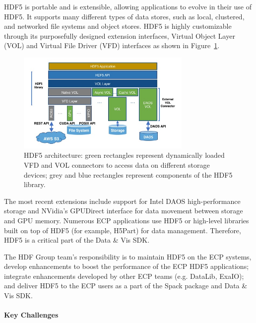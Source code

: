 HDF5 is portable and is extensible, allowing applications to evolve in their use of HDF5. It supports many different types of data stores, such as local, clustered, and networked file systems and object stores. HDF5 is highly customizable through its purposefully designed extension interfaces, Virtual Object Layer (VOL) and Virtual File Driver (VFD) interfaces as shown in Figure~\ref{fig:HDF5-Arch}.
\begin{figure}[htb]
    \centering
    \includegraphics[width=0.75\textwidth]{projects/2.3.4-DataViz/2.3.4.01-DataViz-SDK/HDF5-Arch-small.png}
    \caption{\label{fig:HDF5-Arch}
    HDF5 architecture: green rectangles represent dynamically loaded VFD and VOL connectors to access data on different storage devices; grey and blue rectangles represent components of the HDF5 library.}
\end{figure}

 The most recent extensions include support for Intel DAOS high-performance storage and NVidia’s GPUDirect interface for data movement between storage and GPU memory. 
Numerous ECP applications use HDF5 or high-level libraries built on top of HDF5 (for example, H5Part) for data management. Therefore, HDF5 is a critical part of the Data \& Vis SDK. 

The HDF Group team’s responsibility is to maintain HDF5 on the ECP systems, develop enhancements to boost the performance of the ECP HDF5 applications; integrate enhancements developed by other ECP teams (e.g. DataLib, ExaIO); and deliver HDF5  to the ECP users as a part of the Spack package and Data \& Vis SDK. 

\paragraph{Key  Challenges}
\paragraph{}

